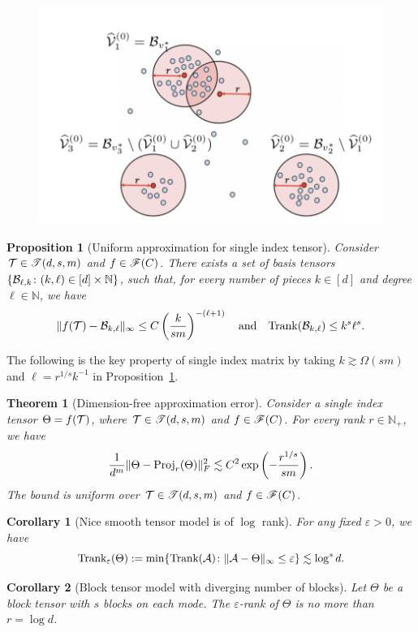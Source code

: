 \documentclass[final,12pt]{colt2020} %
\newtheorem{thm}{Theorem}[section]
\newtheorem{cor}{Corollary}
\newtheorem{prop}{Proposition}
\def\rank{\textup{Trank}}
\def\calif{\large\mathscr{F}}
\def\caliT{\large\mathscr{T}}
\begin{document}
\begin{figure}
\centering
\includegraphics[width=.5\textwidth]{illustrate.png}
\end{figure}

\begin{prop}[Uniform approximation for single index tensor]\label{prop:approximation} Consider $\tT\in\caliT(d,s,m)$ and $f\in\calif(C)$.  There exists a set of basis tensors $\{\mathcal{B}_{\ell,k}\colon (k,\ell)\in[d]\times\mathbb{N}\}$, such that, for every number of pieces $k\in[d]$ and degree $\ell\in\mathbb{N}$, we have
\[
\mnormSize{}{f(\tT)-\tB_{k,\ell}}\leq C\left( {k\over sm}\right)^{-(\ell+1)} \quad \text{and}\quad \rank(\tB_{k,\ell})\leq k^{s}\ell^s.
\]
\end{prop}


The following is the key property of single index matrix by taking $k\gtrsim \Omega(sm)$ and $\ell=r^{1/s}k^{-1}$ in Proposition~\ref{prop:approximation}.
\begin{thm}[Dimension-free approximation error]\label{thm:approximation} Consider a single index tensor $\Theta=f(\mathcal{T})$, where $\tT\in \caliT(d,s,m)$ and $f\in\calif(C)$. For every rank $r\in\mathbb{N}_{+}$,  we have
\[
{1\over d^m}\lVert\Theta-\textup{Proj}_r(\Theta)\rVert_F^2 \lesssim C^2\exp\left(-{r^{1/s}\over sm}\right).
\]
The bound is uniform over $\tT\in\caliT(d,s,m)$ and $f\in\calif(C)$. 
\end{thm}

\begin{cor}[Nice smooth tensor model is of $\log$ rank] For any fixed $\varepsilon>0$, we have
\[
\rank_{\varepsilon}(\Theta):=\min\{\rank(\tA)\colon \mnormSize{}{\tA-\Theta}\leq \varepsilon\}\lesssim \log^s d.
\]
\end{cor}

\begin{cor}[Block tensor model with diverging number of blocks] Let $\Theta$ be a block tensor with $s$ blocks on each mode. The $\varepsilon$-rank of $\Theta$ is no more than
$r=\log d$. 
\end{cor}
\end{document}
